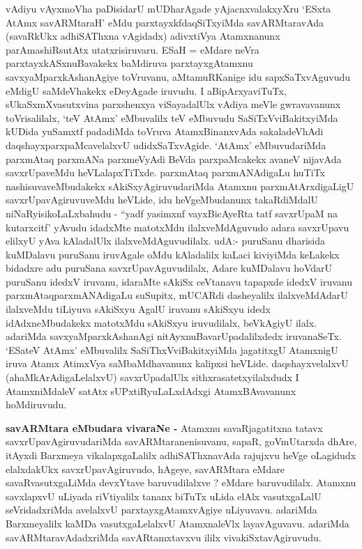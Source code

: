 \begin{artha}
vAdiyu vAyxmoVha paDisidarU mUDharAgade yAjacnxvalakxyXru `ESxta AtAmx savARMtaraH' eMdu parxtayxkfdaqSiTxyiMda savARMtaravAda (savaRkUkx adhiSAThxna vAgidadx) adivxtiVya Atamxnanunx parAmashiRsutAtx utatxrisiruvaru. ESaH = eMdare neVra parxtayxkASxnuBavakekx baMdiruva parxtayxgAtamxnu savxyaMparxkAshanAgiye toVruvanu, aMtamuRKanige idu sapxSaTxvAguvudu eMdigU saMdeVhakekx eDeyAgade iruvudu. I aBipArxyaviTuTx, sUkaSxmXvasutxvina parxshenxya viSayadalUlx vAdiya meVle gwravavanunx toVrisalilalx, `teV AtAmx' eMbuvalilx teV eMbuvudu SaSiTxVviBakitxyiMda kUDida yuSamxtf padadiMda toVruva AtamxBinanxvAda sakaladeVhAdi daqshayxparxpaMcavelalxvU udidxSaTxvAgide. `AtAmx' eMbuvudariMda parxmAtaq parxmANa parxmeVyAdi BeVda parxpaMcakekx avaneV nijavAda savxrUpaveMdu heVLalapxTiTxde. parxmAtaq parxmANAdigaLu huTiTx nashisuvaveMbudakekx sAkiSxyAgiruvudariMda Atamxnu parxmAtArxdigaLigU savxrUpavAgiruvuveMdu heVLide, idu heVgeMbudanunx takaRdiMdalU niNaRyisikoLaLxbahudu - ``yadf yasimxnf vayxBicAyeRta tatf savxrUpaM na kutarxcitf' yAvudu idadxMte matotxMdu ilalxveMdAguvudo adara savxrUpavu elilxyU yAva kAladalUlx ilalxveMdAguvudilalx. udA:- puruSanu dharisida kuMDalavu puruSanu iruvAgale oMdu kAladalilx kaLaci kiviyiMda keLakekx bidadxre adu puruSana savxrUpavAguvudilalx, Adare kuMDalavu hoVdarU puruSanu idedxV iruvanu, idaraMte sAkiSx ceVtanavu tapapxde idedxV iruvanu parxmAtaqparxmANAdigaLu suSupitx, mUCARdi dasheyalilx ilalxveMdAdarU ilalxveMdu tiLiyuva sAkiSxyu AgalU iruvanu sAkiSxyu idedx idAdxneMbudakekx matotxMdu sAkiSxyu iruvudilalx, beVkAgiyU ilalx. adariMda savxyaMparxkAshanAgi nitAyxnuBavarUpadalilxdedx iruvanaSeTx. `ESateV AtAmx' eMbuvalilx SaSiThxVviBakitxyiMda jagatitxgU AtamxnigU iruva Atamx AtimxVya saMbaMdhavanunx kalipxsi heVLide. daqshayxvelalxvU (ahaMkArAdigaLelalxvU) savxrUpadalUlx sithxrasatetxyilalxdudx I AtamxniMdaleV satAtx sUPxtiRyuLaLxdAdxgi AtamxBAvavanunx hoMdiruvudu.
\end{artha}

\begin{artha}
{\bf savARMtara eMbudara vivaraNe -} Atamxnu savaRjagatitxna tatavx savxrUpavAgiruvudariMda savARMtaranenisuvanu, sapaR, goVmUtarxda dhAre, itAyxdi Barxmeya vikalapxgaLalilx adhiSAThxnavAda rajujxvu heVge oLagidudx elalxdakUkx savxrUpavAgiruvudo, hAgeye, savARMtara eMdare savaRvasutxgaLiMda devxYtave baruvudilalxve ? eMdare baruvudilalx. Atamxnu savxlapxvU uLiyada riVtiyalilx tananx biTuTx uLida elAlx vasutxgaLalU seVridadxriMda avelalxvU parxtayxgAtamxvAgiye uLiyuvavu. adariMda Barxmeyalilx kaMDa vasutxgaLelalxvU AtamxnaleVlx layavAguvavu. adariMda savARMtaravAdadxriMda savARtamxtavxvu ililx vivakiSxtavAgiruvudu. 
\end{artha}

